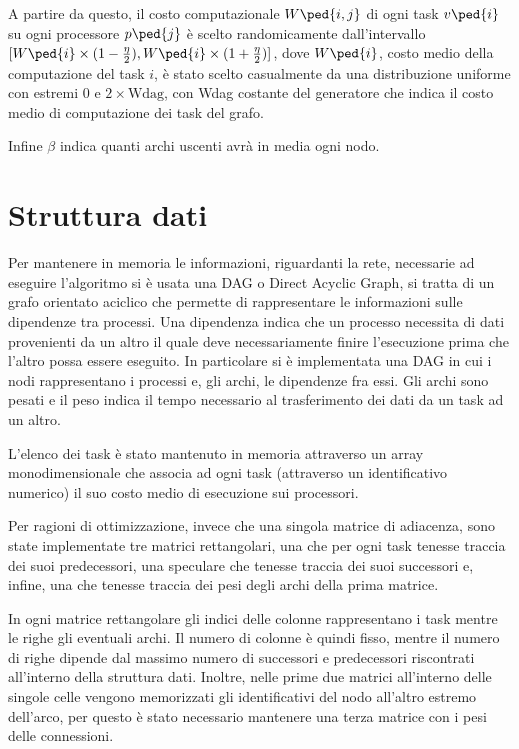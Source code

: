 A partire da questo, il costo computazionale $W\ped{i,j}$ di ogni task $v\ped{i}$ su ogni processore $p\ped{j}$ è scelto randomicamente dall'intervallo $[W\ped{i}\times (1-\frac{\eta}{2}), W\ped{i}\times (1+\frac{\eta}{2})]$, dove $W\ped{i}$, costo medio della computazione del task $i$, è stato scelto casualmente da una distribuzione uniforme con estremi $0$ e $2 \times \text{Wdag}$, con Wdag costante del generatore che indica il costo medio di computazione dei task del grafo.

Infine $\beta$ indica quanti archi uscenti avrà in media ogni nodo.

\section{Struttura dati}
Per mantenere in memoria le informazioni, riguardanti la rete, necessarie ad eseguire l'algoritmo si è usata una DAG o Direct Acyclic Graph, si tratta di un grafo orientato aciclico che permette di rappresentare le informazioni sulle dipendenze tra processi. Una dipendenza indica che un processo necessita di dati provenienti da un altro il quale deve necessariamente finire l'esecuzione prima che l'altro possa essere eseguito.
In particolare si è implementata una DAG in cui i nodi rappresentano i processi e, gli archi, le dipendenze fra essi. Gli archi sono pesati e il peso indica il tempo necessario al trasferimento dei dati da un task ad un altro.

L'elenco dei task è stato mantenuto in memoria attraverso un array monodimensionale che associa ad ogni task (attraverso un identificativo numerico) il suo costo medio di esecuzione sui processori.

Per ragioni di ottimizzazione, invece che una singola matrice di adiacenza, sono state implementate tre matrici rettangolari, una che per ogni task tenesse traccia dei suoi predecessori, una speculare che tenesse traccia dei suoi successori e, infine, una che tenesse traccia dei pesi degli archi della prima matrice.

In ogni matrice rettangolare gli indici delle colonne rappresentano i task mentre le righe gli eventuali archi. Il numero di colonne è quindi fisso, mentre il numero di righe dipende dal massimo numero di successori e predecessori riscontrati all'interno della struttura dati. Inoltre, nelle prime due matrici all'interno delle singole celle vengono memorizzati gli identificativi del nodo all'altro estremo dell'arco, per questo è stato necessario mantenere una terza matrice con i pesi delle connessioni.

